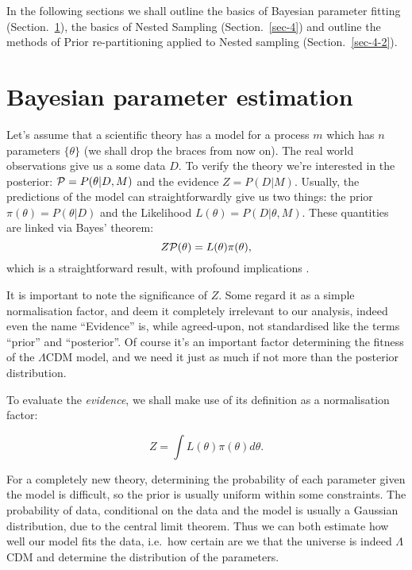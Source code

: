\documentclass[11pt, reprint]{revtex4-2}
\begin{document}
In the following sections we shall outline the basics of Bayesian
parameter fitting (Section.~\ref{sec-2}), the basics of Nested
Sampling (Section.~\ref{sec-4}) and outline the methods of Prior
re-partitioning applied to Nested sampling (Section.~\ref{sec-4-2}).
\goodbreak%
\section{Bayesian parameter estimation}\label{sec-2}

Let's assume that a scientific theory has a model for a process \(m \)
which has \( n \) parameters \( \lbrace \theta \rbrace \) (we shall drop the braces
from now on). The real world observations give us a some data \( D
\). To verify the theory we're interested in the posterior:
\( {\cal P} = P(\theta | D, M) \) and the evidence
\( Z = P ( D | M ) \). Usually, the predictions of the model can
straightforwardly give us two things: the prior
\( \pi (\theta) = P (\theta | D)\) and the Likelihood
\( L(\theta) = P ( D | \theta, M) \). These quantities are linked via Bayes'
theorem: \[ Z {\cal P}(\theta) = L (\theta) \pi(\theta), \] which is a straightforward
result, with profound implications
\cite[p.~31]{jeffreys2010scientific}.

It is important to note the significance of \( Z
\). Some\cite[p.~32]{jeffreys2010scientific} regard it as a simple
normalisation factor, and deem it completely irrelevant to our
analysis, indeed even the name ``Evidence'' is, while agreed-upon, not
standardised like the terms ``prior'' and ``posterior''. Of course
it's an important factor determining the fitness of the $\Lambda$CDM model,
and we need it just as much if not more than the posterior
distribution.

To evaluate the \emph{evidence}, we shall make use of its definition
as a normalisation factor:

\begin{equation}
Z  = \int L (\theta) \pi (\theta) d \theta.
\end{equation}

For a completely new theory, determining the probability of each
parameter given the model is difficult, so the prior is usually
uniform within some
constraints\cite{skilling2006, polychord}. The probability of
data, conditional on the data and the model is usually a Gaussian
distribution, due to the central limit theorem.  Thus we can both
estimate how well our model fits the data, i.e.~how certain are we
that the universe is indeed $\Lambda$CDM and determine the distribution of
the parameters.
\end{document}
